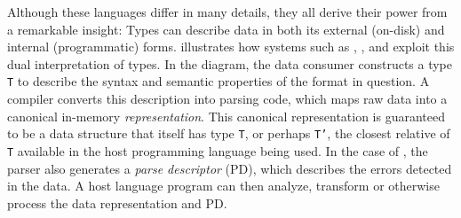 


Although these languages differ in many details, 
they all derive their power from a remarkable insight: 
Types can describe data in both its external (on-disk) and internal
(programmatic) forms.
 illustrates how systems such as
\pads{}, \datascript{}, and \packettypes{} exploit this
dual interpretation of types.  In the diagram,
the data consumer constructs a type {\tt T}
to describe the syntax and semantic properties of the format 
in question.  A compiler converts this
description into parsing code, which maps raw data into a canonical
in-memory {\em representation}.  
This canonical representation is guaranteed to be a data structure
that itself has type {\tt T}, or perhaps {\tt T'}, the closest relative of
{\tt T} available in the host programming language
being used.
In the case of \pads{}, the parser also generates a {\em parse 
descriptor} (PD), which
describes the errors detected in the data.  
A host language program can then analyze, transform or
otherwise process the data representation and PD. 

